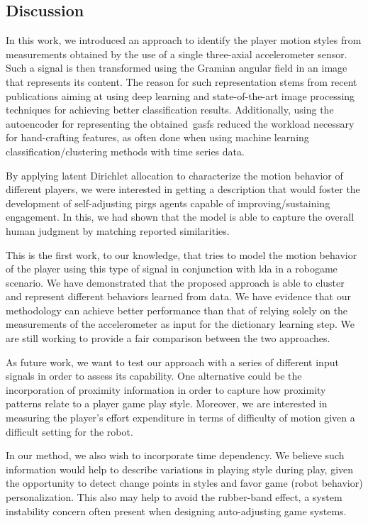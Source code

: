 \subsection{Discussion}
In this work, we introduced an approach to identify the player motion styles from measurements obtained by the use of a single three-axial accelerometer sensor. Such a signal is then transformed using the Gramian angular field in an image that represents its content. The reason for such representation stems from recent publications aiming at using deep learning and state-of-the-art image processing techniques for achieving better classification results. Additionally, using the autoencoder for representing the obtained~\gls{gasf}s reduced the workload necessary for hand-crafting features, as often done when using machine learning classification/clustering methods with time series data.

By applying latent Dirichlet allocation to characterize the motion behavior of different players, we were interested in getting a description that would foster the development of self-adjusting \gls{pirg}s agents capable of improving/sustaining engagement. In this, we had shown that the model is able to capture the overall human judgment by matching reported similarities. 

This is the first work, to our knowledge, that tries to model the motion behavior of the player using this type of signal in conjunction with \gls{lda} in a robogame scenario. We have demonstrated that the proposed approach is able to cluster and represent different behaviors learned from data. We have evidence that our methodology can achieve better performance than that of relying solely on the measurements of the accelerometer as input for the dictionary learning step. We are still working to provide a fair comparison between the two approaches.%

As future work, we want to test our approach with a series of different input signals in order to assess its capability. One alternative could be the incorporation of proximity information in order to capture how proximity patterns relate to a player game play style. Moreover, we are interested in measuring the player's effort expenditure in terms of difficulty of motion given a difficult setting for the robot. 

In our method, we also wish to incorporate time dependency. We believe such information would help to describe variations in playing style during play, given the opportunity to detect change points in styles and favor game (robot behavior) personalization. This also may help to avoid the rubber-band effect, a system instability concern often present when designing auto-adjusting game systems.

